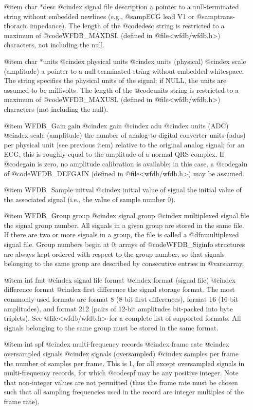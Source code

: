 {{{{{{{{{@item char *desc
@cindex signal file description
a pointer to a null-terminated string without embedded newlines (e.g.,
@samp{ECG lead V1} or @samp{trans-thoracic impedance}).  The length of
the @code{desc} string is restricted to a maximum of @code{WFDB_MAXDSL}
(defined in @file{<wfdb/wfdb.h>}) characters, not including the null.

@item char *units
@cindex physical units
@cindex units (physical)
@cindex scale (amplitude)
a pointer to a null-terminated string without embedded whitespace.  The
string specifies the physical units of the signal; if NULL, the units
are assumed to be millivolts.  The length of the @code{units} string is
restricted to a maximum of @code{WFDB_MAXUSL} (defined in
@file{<wfdb/wfdb.h>}) characters (not including the null).

@item WFDB_Gain gain
@cindex gain
@cindex adu
@cindex units (ADC)
@cindex scale (amplitude)
the number of analog-to-digital converter units (adus) per physical unit
(see previous item) relative to the original analog signal; for an ECG,
this is roughly equal to the amplitude of a normal QRS complex.  If
@code{gain} is zero, no amplitude calibration is available; in this
case, a @code{gain} of @code{WFDB_DEFGAIN} (defined in
@file{<wfdb/wfdb.h>}) may be assumed.

@item WFDB_Sample initval
@cindex initial value of signal
the initial value of the associated signal (i.e., the value of sample
number 0).

@item WFDB_Group group
@cindex signal group
@cindex multiplexed signal file
the signal group number.  All signals in a given group are stored in the
same file.  If there are two or more signals in a group, the file is
called a @dfn{multiplexed signal file}.  Group numbers begin at 0;
arrays of @code{WFDB_Siginfo} structures are always kept ordered with respect
to the group number, so that signals belonging to the same group are
described by consecutive entries in @var{siarray}.

@item int fmt
@cindex signal file format
@cindex format (signal file)
@cindex difference format
@cindex first difference
the signal storage format.  The most commonly-used formats are format 8
(8-bit first differences), format 16 (16-bit amplitudes), and format 212
(pairs of 12-bit amplitudes bit-packed into byte triplets).  See
@file{<wfdb/wfdb.h>} for a complete list of supported formats.  All signals
belonging to the same group must be stored in the same format.

@item int spf
@cindex multi-frequency records
@cindex frame rate
@cindex oversampled signals
@cindex signals (oversampled)
@cindex samples per frame
the number of samples per frame.  This is 1, for all except oversampled
signals in multi-frequency records, for which @code{spf} may be any
positive integer.  Note that non-integer values are not permitted (thus
the frame rate must be chosen such that all sampling frequencies used in
the record are integer multiples of the frame rate).

}}}}}}}}}
